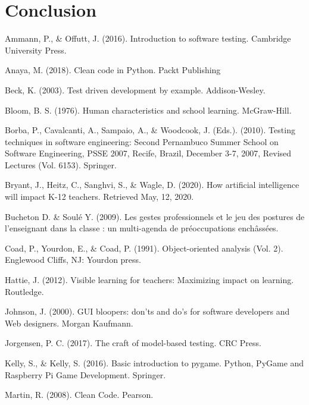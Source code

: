 \documentclass[10pt]{article}
\begin{document}
\section{Conclusion} \label{conclusion} 





\begin{thebibliography}{Xyzz12}

 Ammann, P., \& Offutt, J. (2016). Introduction to software testing. Cambridge University Press.

 Anaya, M. (2018). Clean code in Python. Packt Publishing

 Beck, K. (2003). Test driven development by example. Addison-Wesley.

 Bloom, B. S. (1976). Human characteristics and school learning. McGraw-Hill.

 Borba, P., Cavalcanti, A., Sampaio, A., \& Woodcook, J. (Eds.). (2010). Testing techniques in software engineering: Second Pernambuco Summer School on Software Engineering, PSSE 2007, Recife, Brazil, December 3-7, 2007, Revised Lectures (Vol. 6153). Springer.

 Bryant, J., Heitz, C., Sanghvi, S., \& Wagle, D. (2020). How artificial intelligence will impact K-12 teachers. Retrieved May, 12, 2020.

 Bucheton D. \& Soulé Y. (2009). Les gestes professionnels et le jeu des postures de l’enseignant dans la classe : un multi-agenda de préoccupations enchâssées.

 Coad, P., Yourdon, E., \& Coad, P. (1991). Object-oriented analysis (Vol. 2). Englewood Cliffs, NJ: Yourdon press.

 Hattie, J. (2012). Visible learning for teachers: Maximizing impact on learning. Routledge.

 Johnson, J. (2000). GUI bloopers: don'ts and do's for software developers and Web designers. Morgan Kaufmann.

 Jorgensen, P. C. (2017). The craft of model-based testing. CRC Press.

 Kelly, S., \& Kelly, S. (2016). Basic introduction to pygame. Python, PyGame and Raspberry Pi Game Development. Springer.

 Martin, R. (2008). Clean Code. Pearson.


\end{thebibliography}
\end{document}
